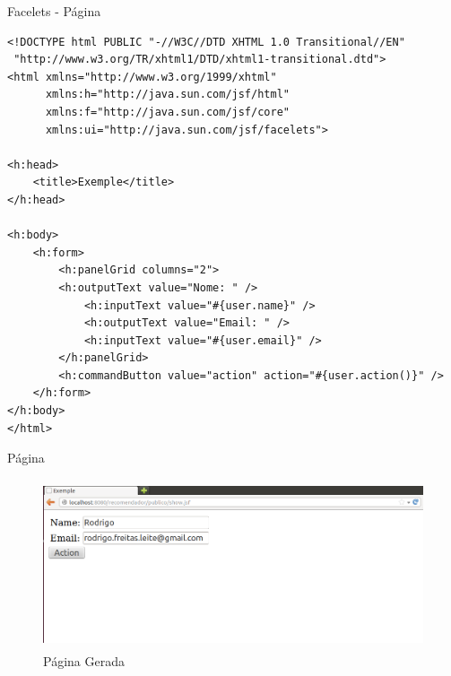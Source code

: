 \documentclass[xcolor=dvipsnames]{beamer}
\begin{document}
\begin{frame}[fragile]{Facelets - Página}
		
	\begin{lstlisting}[style=HTML]
<!DOCTYPE html PUBLIC "-//W3C//DTD XHTML 1.0 Transitional//EN"
 "http://www.w3.org/TR/xhtml1/DTD/xhtml1-transitional.dtd"> 
<html xmlns="http://www.w3.org/1999/xhtml"
      xmlns:h="http://java.sun.com/jsf/html"
      xmlns:f="http://java.sun.com/jsf/core"
      xmlns:ui="http://java.sun.com/jsf/facelets"> 

<h:head>
	<title>Exemple</title>
</h:head>
 
<h:body> 
	<h:form>
		<h:panelGrid columns="2">
		<h:outputText value="Nome: " />
			<h:inputText value="#{user.name}" />
			<h:outputText value="Email: " />
			<h:inputText value="#{user.email}" />		
		</h:panelGrid>
		<h:commandButton value="action" action="#{user.action()}" />
	</h:form>
</h:body> 
</html>
	\end{lstlisting}		

\end{frame}

\begin{frame}{Página}
	\begin{figure}[!htb]
		\centering
		\includegraphics[keepaspectratio=true,height=5cm]{facelets-1rec.png}
		\caption{Página Gerada}
		\label{rec-ER}
\end{figure}

		\end{frame}
\end{document}
